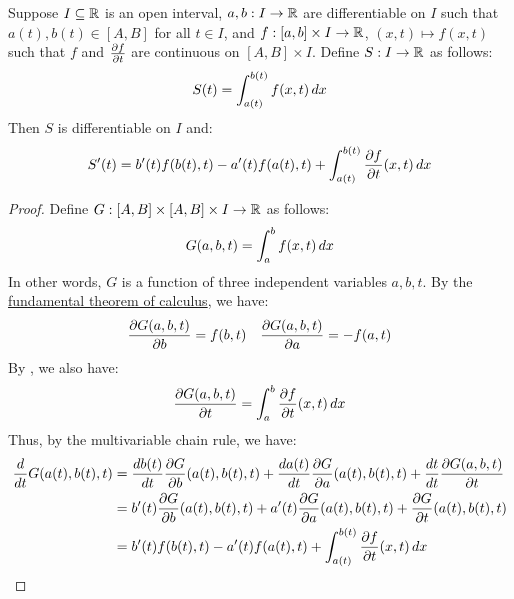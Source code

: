 \documentclass[main.tex]{subfiles}
\begin{document}
\begin{theorem}
    Suppose $I\sub\R$ is an open interval, $a,b:I\to\R$ are differentiable on $I$ such that $a(t),b(t)\in[A,B]$ for all $t\in I$, and $f:[a,b]\times I\to\R$, $(x,t)\mapsto f(x,t)$ such that $f$ and $\pdv{f}{t}$ are continuous on $[A,B]\times I$. Define $S:I\to\R$ as follows:
    \begin{equation*}
        S(t)=\int_{a(t)}^{b(t)} f(x,t)\,dx
    \end{equation*}
    Then $S$ is differentiable on $I$ and:
    \begin{equation*}
        S'(t)=b'(t)f(b(t),t)-a'(t)f(a(t),t)+\int_{a(t)}^{b(t)} \pdv{f}{t}\/(x,t)\,dx
    \end{equation*}
\end{theorem}
\begin{proof}
    Define $G:[A,B]\times[A,B]\times I\to\R$ as follows:
    \begin{equation*}
        G(a,b,t)=\int_a^b f(x,t)\,dx
    \end{equation*}
    In other words, $G$ is a function of three independent variables $a,b,t$. By the \href{https://en.wikipedia.org/wiki/Fundamental_theorem_of_calculus}{fundamental theorem of calculus}, we have:
    \begin{align*}
        \pdv{G(a,b,t)}{b}=f(b,t)
        &&
        \pdv{G(a,b,t)}{a}=-f(a,t)
    \end{align*}
    By , we also have:
    \begin{equation*}
        \pdv{G(a,b,t)}{t}=\int_a^b \pdv{f}{t}\/(x,t)\,dx
    \end{equation*}
    Thus, by the multivariable chain rule, we have:
    \begin{align*}
        \dv{t}G(a(t),b(t),t)
        &= \dv{b(t)}{t}\pdv{G}{b}\/(a(t),b(t),t)+\dv{a(t)}{t}\pdv{G}{a}\/(a(t),b(t),t)+\dv{t}{t}\pdv{G(a,b,t)}{t} \\
        &= b'(t)\pdv{G}{b}\/(a(t),b(t),t)+a'(t)\pdv{G}{a}\/(a(t),b(t),t)+\pdv{G}{t}\/(a(t),b(t),t) \\
        &= b'(t)f(b(t),t)-a'(t)f(a(t),t)+\int_{a(t)}^{b(t)} \pdv{f}{t}\/(x,t)\,dx
    \end{align*}
\end{proof}
\end{document}

